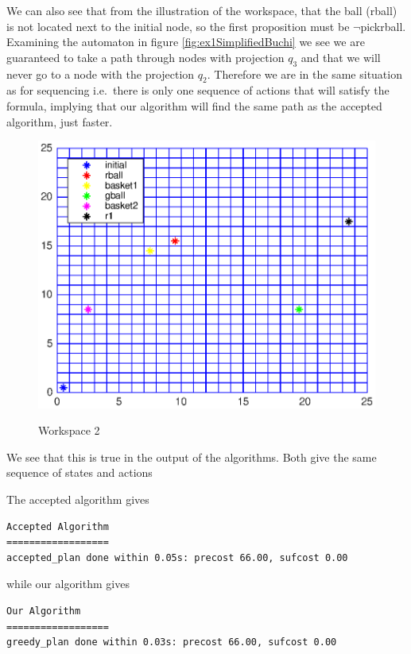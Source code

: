 We can also see that from the illustration of the workspace, that the ball (rball) is not located next to the initial node, so the first proposition must be $\neg$pickrball. Examining the automaton in figure \ref{fig:ex1SimplifiedBuchi} we see we are guaranteed to take a path through nodes with projection $q_3$ and that we will never go to a node with the projection $q_2$. Therefore we are in the same situation as for sequencing i.e.\ there is only one sequence of actions that will satisfy the formula, implying that our algorithm will find the same path as the accepted algorithm, just faster. 

\begin{figure}[!htb]
\centering
\includegraphics[scale=1]{workspace2.eps}
\label{fig:workspace2}
\caption{Workspace 2}
\end{figure}

We see that this is true in the output of the algorithms. Both give the same sequence of states and actions


The accepted algorithm gives 
\begingroup
\fontsize{9pt}{12pt}\selectfont
\begin{lstlisting}
Accepted Algorithm
==================
accepted_plan done within 0.05s: precost 66.00, sufcost 0.00
\end{lstlisting}
\endgroup


while our algorithm gives 
\begingroup
\fontsize{9pt}{12pt}\selectfont
\begin{lstlisting}
Our Algorithm
==================
greedy_plan done within 0.03s: precost 66.00, sufcost 0.00
\end{lstlisting}
\endgroup


